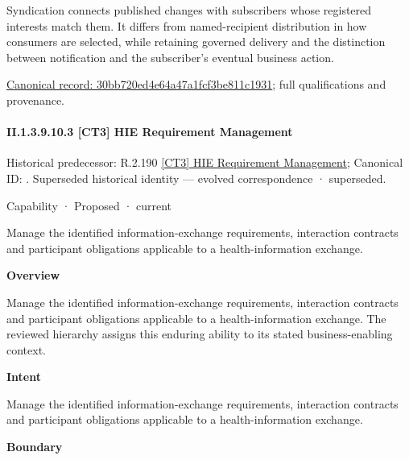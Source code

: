 Syndication connects published changes with subscribers whose registered interests match them. It differs from named-recipient distribution in how consumers are selected, while retaining governed delivery and the distinction between notification and the subscriber's eventual business action.


{\footnotesize \href{../../../../continuum/strategy/capability/feature/30bb720ed4e64a47a1fcf3be811c1931.md}{Canonical record: 30bb720ed4e64a47a1fcf3be811c1931}; full qualifications and provenance.}\par
\paragraph*{II.1.3.9.10.3 [CT3] HIE Requirement Management}
\label{navigation:II.1.3.9.10.3}

{\small Historical predecessor: R.2.190 \hyperref[element:a32c8bff0c284f5c9d6ab1f46991c232]{[CT3] HIE Requirement Management}; Canonical ID: \texttt{}. Superseded historical identity — evolved correspondence · superseded.}\par
\label{element:1c852a1799984feba50011172983c865}
{\small Capability · Proposed · current}\par

Manage the identified information-exchange requirements, interaction contracts and participant obligations applicable to a health-information exchange.



\textbf{Overview}



Manage the identified information-exchange requirements, interaction contracts and participant obligations applicable to a health-information exchange. The reviewed hierarchy assigns this enduring ability to its stated business-enabling context.



\textbf{Intent}



Manage the identified information-exchange requirements, interaction contracts and participant obligations applicable to a health-information exchange.



\textbf{Boundary}



